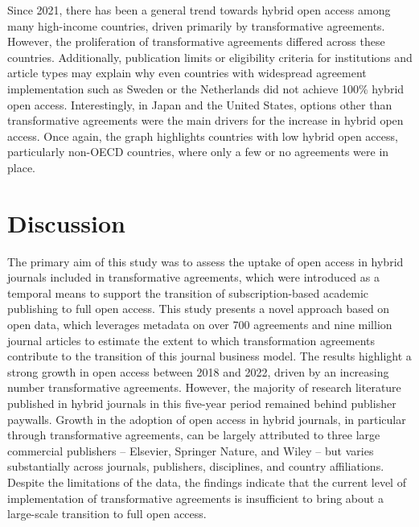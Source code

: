 \documentclass[a4paper,man,floatsintext,longtable,noextraspace,12pt]{apa6}
\begin{document}
Since 2021, there has been a general trend towards hybrid open access
among many high-income countries, driven primarily by transformative
agreements. However, the proliferation of transformative agreements
differed across these countries. Additionally, publication limits or
eligibility criteria for institutions and article types may explain why
even countries with widespread agreement implementation such as Sweden
or the Netherlands did not achieve 100\% hybrid open access.
Interestingly, in Japan and the United States, options other than
transformative agreements were the main drivers for the increase in
hybrid open access. Once again, the graph highlights countries with low
hybrid open access, particularly non-OECD countries, where only a few or
no agreements were in place.

\section{Discussion}\label{discussion}

The primary aim of this study was to assess the uptake of open access in
hybrid journals included in transformative agreements, which were
introduced as a temporal means to support the transition of
subscription-based academic publishing to full open access. This study
presents a novel approach based on open data, which leverages metadata
on over 700 agreements and nine million journal articles to estimate the
extent to which transformation agreements contribute to the transition
of this journal business model. The results highlight a strong growth in
open access between 2018 and 2022, driven by an increasing number
transformative agreements. However, the majority of research literature
published in hybrid journals in this five-year period remained behind
publisher paywalls. Growth in the adoption of open access in hybrid
journals, in particular through transformative agreements, can be
largely attributed to three large commercial publishers -- Elsevier,
Springer Nature, and Wiley -- but varies substantially across journals,
publishers, disciplines, and country affiliations. Despite the
limitations of the data, the findings indicate that the current level of
implementation of transformative agreements is insufficient to bring
about a large-scale transition to full open access.
\end{document}
